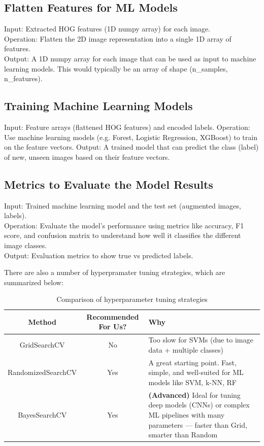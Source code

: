 \documentclass{article}
\begin{document}
\vspace{0.5cm}
    

\subsection{ Flatten Features for ML Models}\label{flatten_features}
Input: Extracted HOG features (1D numpy array) for each image.\\
Operation: Flatten the 2D image representation into a single 1D array of features.\\
Output: A 1D numpy array for each image that can be used as input to machine learning models. This would typically be an array of shape (n\_samples, n\_features).\\
\subsection{Training Machine Learning Models}\label{train_ML}
Input: Feature arrays (flattened HOG features) and encoded labels.
Operation: Use machine learning models (e.g. Forest, Logistic Regression, XGBoost) to train on the feature vectors.
Output: A trained model that can predict the class (label) of new, unseen images based on their feature vectors.

\subsection{Metrics to Evaluate the Model Results} \label{metrics_ML}
Input: Trained machine learning model and the test set (augmented images, labels).\\
Operation: Evaluate the model's performance using metrics like accuracy, F1 score, and confusion matrix to understand how well it classifies the different 
image classes.\\
Output: Evaluation metrics to show true vs predicted labels.

There are also a number of hyperpramater tuning strategies, which are summarized below:
\begin{table}[ht]
    \centering
    \renewcommand{\arraystretch}{1.3}
    \begin{tabular}{|c|c|p{8cm}|}
        \hline
        \textbf{Method} & \textbf{Recommended For Us?} & \textbf{Why} \\ \hline
        GridSearchCV & No & Too slow for SVMs (due to image data + multiple classes) \\ \hline
        RandomizedSearchCV & Yes & A great starting point. Fast, simple, and well-suited for ML models like SVM, k-NN, RF \\ \hline
        BayesSearchCV & Yes & \textbf{(Advanced)} Ideal for tuning deep models (CNNs) or complex ML pipelines with many parameters — faster than Grid, smarter than Random \\ \hline
    \end{tabular}
    \caption{Comparison of hyperparameter tuning strategies}
    \label{tab:tuning_methods}
\end{table}
\end{document}
